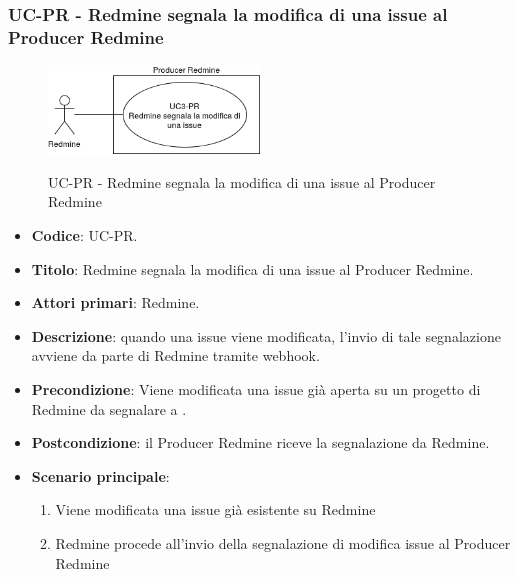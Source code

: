 	\subsubsection{UC\theuccount-PR - Redmine segnala la modifica di una issue al Producer Redmine}
	\begin{figure}[H]
		\centering
		\includegraphics[width=0.5\textwidth]{img/casi_d'uso/UC3.png}\\
		\caption{UC\theuccount-PR - Redmine segnala la modifica di una issue al Producer Redmine}
	\end{figure}
	\begin{itemize}
		\item \textbf{Codice}: UC\theuccount-PR.
		\item \textbf{Titolo}: Redmine segnala la modifica di una issue al Producer Redmine.
		\item \textbf{Attori primari}: Redmine.
		\item \textbf{Descrizione}: quando una issue viene modificata, l'invio di tale segnalazione
			avviene da parte di Redmine tramite webhook.
		\item \textbf{Precondizione}: Viene modificata una issue già aperta su un
		progetto di Redmine da segnalare a \progetto.
		\item \textbf{Postcondizione}: il Producer Redmine riceve la segnalazione da Redmine.
		\item \textbf{Scenario principale}: 
		\begin{enumerate}
			\item Viene modificata una issue già esistente su Redmine
			\item Redmine procede all'invio della segnalazione di modifica issue al Producer Redmine
		\end{enumerate}
		
	\end{itemize}